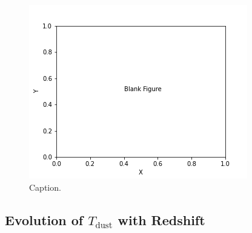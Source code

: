 \begin{figure}
	\centering
	\includegraphics[width=0.75\columnwidth]{Figures/blank_figure.png}
	\caption{Caption.}
	\label{fig:beta_z_evolution}
\end{figure}

\subsection{Evolution of $T_{\textrm{dust}}$ with Redshift}

